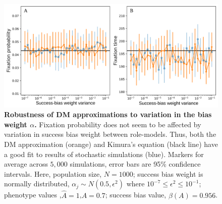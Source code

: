 \documentclass[12pt]{extarticle}
\begin{document}
\begin{figure}
    \includegraphics[width=\linewidth]{full_vs_dm_changing_alpha.pdf}
   \caption{\textbf{Robustness of DM approximations to variation in the bias weight $\alpha$.} 
   Fixation probability does not seem to be affected by variation in success bias weight between role-models.
    Thus, both the DM approximation (orange) and Kimura's equation (black line) have a good fit to results of stochastic simulations (blue).
   Markers for average across $5,000$ simulations, error bars are 95\% confidence intervals.
  Here, population size, $N=1000$; 
  success bias weight is normally distributed, $\alpha_j \sim N(0.5,\epsilon^2)$ where $10^{-7}\le \epsilon^2 \le 10^{-1}$; 
  phenotype values ,$\hat{A}=1$,$A=0.7$; success bias value, $\beta(A)=0.956$.}	
  \label{fig:hetro_alpha}
\end{figure}
\end{document}
